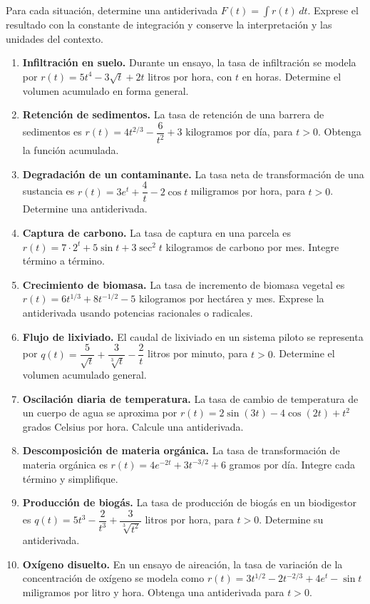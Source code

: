 \documentclass[11pt,a4paper]{article}
\begin{document}
Para cada situación, determine una antiderivada $F(t)=\int r(t)\,dt$. Exprese el resultado con la constante de integración y conserve la interpretación y las unidades del contexto.

\begin{enumerate}[leftmargin=*,itemsep=8pt,label=\textbf{\arabic*.}]
  \item \textbf{Infiltración en suelo.} Durante un ensayo, la tasa de infiltración se modela por $r(t)=5t^4-3\sqrt{t}+2t$ litros por hora, con $t$ en horas. Determine el volumen acumulado en forma general.
  \item \textbf{Retención de sedimentos.} La tasa de retención de una barrera de sedimentos es $r(t)=4t^{2/3}-\dfrac{6}{t^2}+3$ kilogramos por día, para $t>0$. Obtenga la función acumulada.
  \item \textbf{Degradación de un contaminante.} La tasa neta de transformación de una sustancia es $r(t)=3e^t+\dfrac{4}{t}-2\cos t$ miligramos por hora, para $t>0$. Determine una antiderivada.
  \item \textbf{Captura de carbono.} La tasa de captura en una parcela es $r(t)=7\cdot2^t+5\sin t+3\sec^2 t$ kilogramos de carbono por mes. Integre término a término.
  \item \textbf{Crecimiento de biomasa.} La tasa de incremento de biomasa vegetal es $r(t)=6t^{1/3}+8t^{-1/2}-5$ kilogramos por hectárea y mes. Exprese la antiderivada usando potencias racionales o radicales.
  \item \textbf{Flujo de lixiviado.} El caudal de lixiviado en un sistema piloto se representa por $q(t)=\dfrac{5}{\sqrt{t}}+\dfrac{3}{\sqrt[3]{t}}-\dfrac{2}{t}$ litros por minuto, para $t>0$. Determine el volumen acumulado general.
  \item \textbf{Oscilación diaria de temperatura.} La tasa de cambio de temperatura de un cuerpo de agua se aproxima por $r(t)=2\sin(3t)-4\cos(2t)+t^2$ grados Celsius por hora. Calcule una antiderivada.
  \item \textbf{Descomposición de materia orgánica.} La tasa de transformación de materia orgánica es $r(t)=4e^{-2t}+3t^{-3/2}+6$ gramos por día. Integre cada término y simplifique.
  \item \textbf{Producción de biogás.} La tasa de producción de biogás en un biodigestor es $q(t)=5t^3-\dfrac{2}{t^3}+\dfrac{3}{\sqrt[3]{t^2}}$ litros por hora, para $t>0$. Determine su antiderivada.
  \item \textbf{Oxígeno disuelto.} En un ensayo de aireación, la tasa de variación de la concentración de oxígeno se modela como $r(t)=3t^{1/2}-2t^{-2/3}+4e^t-\sin t$ miligramos por litro y hora. Obtenga una antiderivada para $t>0$.
\end{enumerate}
\end{document}
